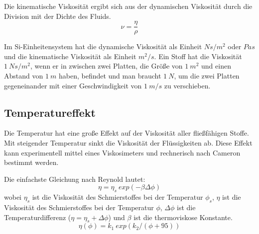 Die kinematische Viskosität ergibt sich aus der dynamischen Viskosität durch die Division mit der Dichte des Fluids.
\begin{equation}
    \nu = \frac{\eta}{\rho}
    \label{eq:kinematische_viskotitaet}
\end{equation}

Im Si-Einheitensystem hat die dynamische Viskosität als Einheit $N  s/m^2$ oder $Pa  s$ und die kinematische Viskosität als Einheit $m^2/s$.
Ein Stoff hat die Viskosität $1~N  s/m^2$, wenn er in zwischen zwei Platten, die Größe von $1~m^2$ und einen Abstand von $1~m$ haben, befindet und man braucht $1~N$, um die zwei Platten gegeneinander mit einer Geschwindigkeit von $1~m/s$ zu verschieben.

\subsection*{Temperatureffekt}
\label{sub:temperatureffekt}
Die Temperatur hat eine große Effekt auf der Viskosität aller fließfähigen Stoffe.
Mit steigender Temperatur sinkt die Viskosität der Flüssigkeiten ab.
Diese Effekt kann experimentell mittel eines Viskosimeters und rechnerisch nach Cameron bestimmt werden.

Die einfachste Gleichung nach Reynold lautet:
\begin{equation}
    \eta = \eta_{s}  \ exp \left( -\beta  \Delta\phi \right)
    \label{eq:dynamische_viskositaet_reynold}
\end{equation}
%
wobei $\eta_{s}$ ist die Viskosität des Schmierstoffes bei der Temperatur $\phi_{s}$, $\eta$ ist die Viskosität des Schmierstoffes bei der Temperatur $\phi$, $\Delta{\phi}$ ist die Temperaturdifferenz ($\eta = \eta_{s} + \Delta{\phi}$) und $\beta$ ist die thermoviskose Konstante.
\begin{equation}
    \eta(\phi) = k_1  \ exp \left( k_2 / (\phi + 95) \right)
    \label{eq:dynamische_viskositaet_cameron}
\end{equation}

